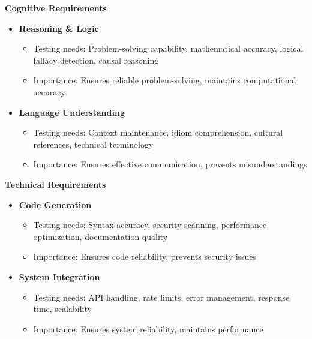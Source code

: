 \textbf{Cognitive Requirements}
\begin{itemize}
    \item \textbf{Reasoning \& Logic}
    \begin{itemize}
        \item Testing needs: Problem-solving capability, mathematical accuracy, logical fallacy detection, causal reasoning
        \item Importance: Ensures reliable problem-solving, maintains computational accuracy
    \end{itemize}
    
    \item \textbf{Language Understanding}
    \begin{itemize}
        \item Testing needs: Context maintenance, idiom comprehension, cultural references, technical terminology
        \item Importance: Ensures effective communication, prevents misunderstandings
    \end{itemize}
\end{itemize}

\textbf{Technical Requirements}
\begin{itemize}
    \item \textbf{Code Generation}
    \begin{itemize}
        \item Testing needs: Syntax accuracy, security scanning, performance optimization, documentation quality
        \item Importance: Ensures code reliability, prevents security issues
    \end{itemize}
    
    \item \textbf{System Integration}
    \begin{itemize}
        \item Testing needs: API handling, rate limits, error management, response time, scalability
        \item Importance: Ensures system reliability, maintains performance
    \end{itemize}
\end{itemize}


